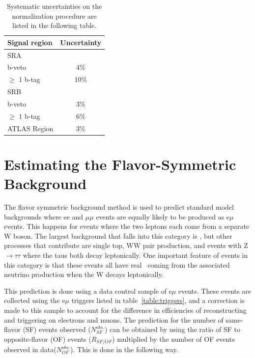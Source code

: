 \begin{table}[htb]
  \scriptsize
  \begin{center}
    \caption{\label{tab:template_systematics_reweighting} 
      Systematic uncertainties on the normalization procedure are listed in the following table.
    }
    \begin{tabular}{l|c}
      \hline
      \hline
      Signal region & Uncertainty \\
      \hline
      SRA                 &       \\ 
      \hline
      b-veto              &  4\%  \\ 
      $\geq$ 1 b-tag      & 10\%  \\ 
      \hline
      SRB                 &       \\ 
      \hline
      b-veto              &  3\%  \\ 
      $\geq$ 1 b-tag      &  6\%  \\ 
      \hline
      ATLAS Region &  3\%  \\ 
      \hline
      \hline
    \end{tabular}
  \end{center}
\end{table}

\section{Estimating the Flavor-Symmetric Background}
\label{sec:bkg_fs}
The flavor symmetric background method is used to predict standard model backgrounds
where ee and $\mu\mu$ events are equally likely to be produced as e$\mu$ events.
This happens for events where the two leptons each come from a separate W boson.
The largest background that falls into this category is \ttbar,
but other processes that contribute are single top, WW pair production, and events with Z$\rightarrow\tau\tau$ where the taus both decay leptonically.
One important feature of events in this category is that these events all have real \MET\ coming from the associated neutrino production when the W decays leptonically.

This prediction is done using a data control sample of e$\mu$ events.
These events are collected using the e$\mu$ triggers listed in table~\ref{table:triggers},
and a correction is made to this sample to account for the difference in efficiencies of reconstructing and triggering on electrons and muons.
The prediction for the number of same-flavor (SF) events observed ($N_{SF}^{obs.}$)
can be obtained by using the ratio of SF to opposite-flavor (OF) events ($R_{SF/OF}$) multiplied by the number of OF events observed in data($N_{OF}^{obs.}$).
This is done in the following way.

